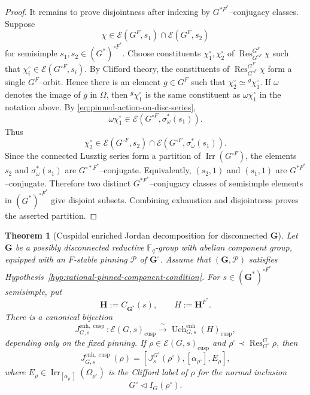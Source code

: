 \documentclass{amsart}
\theoremstyle{plain}
\numberwithin{equation}{section}
\newtheorem{theorem}{Theorem}[section]
\theoremstyle{definition}
\newcommand{\cP}{\mathcal{P}}
\newcommand{\cE}{\mathcal{E}}
\newcommand{\Res}{\operatorname{Res}}
\newcommand{\Irr}{\operatorname{Irr}}
\newcommand{\Uch}{\operatorname{Uch}}
\newcommand{\J}{\mathbb{J}}
\newcommand{\cusp}{\operatorname{cusp}}
\newcommand{\bG}{\mathbf{G}}
\newcommand{\bH}{\mathbf{H}}
\newcommand{\F}{\mathbb{F}}
\begin{document}
\begin{proof}
It remains to prove disjointness after indexing by $G^{*F^*}$--conjugacy
classes.  Suppose
\[
\chi\in \cE(G^F,s_1)\cap \cE(G^F,s_2)
\]
for semisimple $s_1,s_2\in (G^*)^{\circ F^*}$.  Choose constituents
$\chi_1^\circ,\chi_2^\circ$ of $\Res^{G^F}_{G^{\circ F}}\chi$ such that
$\chi_i^\circ\in \cE(G^{\circ F},s_i)$.  By Clifford theory, the constituents
of $\Res^{G^F}_{G^{\circ F}}\chi$ form a single $G^F$--orbit.  Hence there is
an element $g\in G^F$ such that
$\chi_2^\circ\simeq {}^g\chi_1^\circ$.  If $\omega$ denotes the image of $g$
in $\Omega$, then ${}^g\chi_1^\circ$ is the same constituent as
$\omega\chi_1^\circ$ in the notation above.  By
\eqref{eq:pinned-action-on-disc-series},
\[
\omega\chi_1^\circ\in
\cE(G^{\circ F},\sigma_\omega^*(s_1)).
\]
Thus
\[
\chi_2^\circ\in
\cE(G^{\circ F},s_2)
\cap
\cE(G^{\circ F},\sigma_\omega^*(s_1)).
\]
Since the connected Lusztig series form a partition of
$\Irr(G^{\circ F})$, the elements $s_2$ and $\sigma_\omega^*(s_1)$ are
$G^{\circ *F^*}$--conjugate.  Equivalently, $(s_2,1)$ and $(s_1,1)$ are
$G^{*F^*}$--conjugate.  Therefore two distinct $G^{*F^*}$--conjugacy classes
of semisimple elements in $(G^*)^{\circ F^*}$ give disjoint subsets.  Combining
exhaustion and disjointness proves the asserted partition.
\end{proof}

\begin{theorem}[Cuspidal enriched Jordan decomposition for disconnected $\bG$]
\label{thm:disc-cusp-JD}
Let \(\bG\) be a possibly disconnected reductive \(\F_q\)-group with abelian
component group, equipped with an \(F\)-stable pinning \(\cP\) of
\(\bG^\circ\).  Assume that \((\bG,\cP)\) satisfies
Hypothesis~\ref{hyp:rational-pinned-component-condition}.  For
\(s\in(\bG^*)^{\circ F^*}\) semisimple, put
\[
        \bH:=C_{\bG^*}(s),\qquad H:=\bH^{F^*}.
\]
There is a canonical bijection
\[
J^{\mathrm{enh},\cusp}_{G,s}:
\cE(G,s)_{\cusp}
\xrightarrow{\ \sim\ }
\Uch^{\mathrm{enh}}_{G,s}(H)_{\cusp},
\]
depending only on the fixed pinning.  If \(\rho\in\cE(G,s)_{\cusp}\) and
\(\rho^\circ\prec\Res^G_{G^\circ}\rho\), then
\[
J^{\mathrm{enh},\cusp}_{G,s}(\rho)
=
\left[
\J_s^{G^\circ}(\rho^\circ),
[\alpha_{\rho^\circ}],
E_\rho
\right],
\]
where \(E_\rho\in\Irr_{[\alpha_{\rho^\circ}]}(\Omega_{\rho^\circ})\) is the
Clifford label of \(\rho\) for the normal inclusion
\[
        G^\circ\lhd I_G(\rho^\circ).
\]
\end{theorem}
\end{document}
